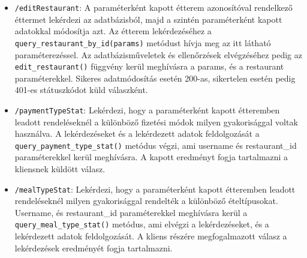 \begin{itemize}
\item \texttt{/editRestaurant}:
A paraméterként kapott étterem azonosítóval rendelkező éttermet lekérdezi az adatbázisból, majd a szintén paraméterként kapott adatokkal módosítja azt. Az étterem lekérdezéséhez a \texttt{query\_restaurant\_by\_id(params)} metódust hívja meg az itt látható paraméterezéssel. Az adatbázisműveletek és ellenőrzések elvégzéséhez pedig az \texttt{edit\_restaurant()} függvény kerül meghívásra a params, és a restaurant paraméterekkel. Sikeres adatmódosítás esetén 200-as, sikertelen esetén pedig 401-es státuszkódot küld válaszként.
\item \texttt{/paymentTypeStat}:
Lekérdezi, hogy a paraméterként kapott étteremben leadott rendeléseknél a különböző fizetési módok milyen gyakorisággal voltak használva. A lekérdezéseket és a lekérdezett adatok feldolgozását a \texttt{query\_payment\_type\_stat()} metódus végzi, ami username és restaurant\_id paraméterekkel kerül meghívásra. A kapott eredményt fogja tartalmazni a kliensnek küldött válasz.
\item \texttt{/mealTypeStat}:
Lekérdezi, hogy a paraméterként kapott étteremben leadott rendeléseknél milyen gyakorisággal rendelték a különböző ételtípusokat. Username, és restaurant\_id paraméterekkel meghívásra kerül a \texttt{query\_meal\_type\_stat()} metódus, ami elvégzi a lekérdezéseket, és a lekérdezett adatok feldolgozását. A kliens részére megfogalmazott válasz a lekérdezések eredményét fogja tartalmazni.
\end{itemize}
